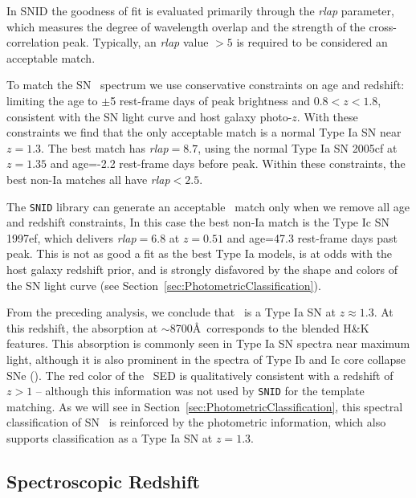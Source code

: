 In SNID the goodness of fit is evaluated primarily through the {\it
rlap} parameter, which measures the degree of wavelength overlap and
the strength of the cross-correlation peak.  Typically, an {\it rlap}
value $>5$ is required to be considered an acceptable match.  

To match the SN \tomas\ spectrum we use conservative constraints on
age and redshift: limiting the age to $\pm$5 rest-frame days of peak
brightness and $0.8<z<1.8$, consistent with the SN light curve and
host galaxy photo-$z$.  With these constraints we find that the only
acceptable match is a normal Type Ia SN near $z=1.3$. The best match
has {\it rlap}$=8.7$, using the normal Type Ia SN 2005cf at $z=1.35$
and age=-2.2 rest-frame days before peak.  Within these constraints,
the best non-Ia matches all have {\it rlap}$<2.5$.

The {\tt SNID} library can generate an acceptable \CCSN\ match only
when we remove all age and redshift constraints, In this case the best
non-Ia match is the Type Ic SN 1997ef, which delivers {\it rlap}$=6.8$
at $z=0.51$ and age=47.3 rest-frame days past peak.  This is not as
good a fit as the best Type Ia models, is at odds with the host galaxy
redshift prior, and is strongly disfavored by the shape and colors of
the SN light curve (see Section~\ref{sec:PhotometricClassification}).  

From the preceding analysis, we conclude that \tomas\ is a Type Ia SN
at $z\approx1.3$.  At this redshift, the absorption at $\sim$8700\AA\
corresponds to the blended  H\&K features.
This \ion{Ca}{2} absorption is commonly seen in Type Ia SN spectra
near maximum light, although it is also prominent in the spectra of
Type Ib and Ic core collapse SNe (\CCSNe).  The red color of
the \tomas\ SED is qualitatively consistent with a redshift of $z>1$
-- although this information was not used by {\tt SNID} for the
template matching.  As we will see in Section~\ref{sec:PhotometricClassification},
this spectral classification of SN \tomas\ is reinforced by the
photometric information, which also supports classification as a Type
Ia SN at $z=1.3$.


\subsection{Spectroscopic Redshift}
\label{sec:SpecRedshift}

